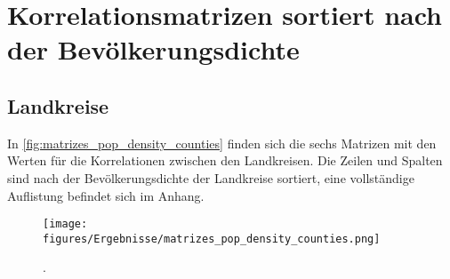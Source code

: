 \section{Korrelationsmatrizen sortiert nach der Bevölkerungsdichte}
\subsection{Landkreise}
In \autoref{fig:matrizes_pop_density_counties} finden sich die sechs Matrizen mit den Werten für die Korrelationen zwischen den Landkreisen. Die Zeilen und Spalten sind nach der Bevölkerungsdichte der Landkreise sortiert, eine vollständige Auflistung befindet sich im Anhang.


\begin{figure}[H]
    \centering
    \texttt{[image: figures/Ergebnisse/matrizes\_pop\_density\_counties.png]}
    \caption{.}
    \label{fig:matrizes_pop_density_counties}
\end{figure}